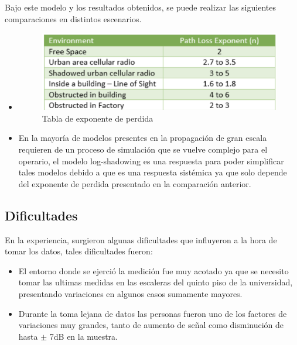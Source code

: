   
  Bajo este modelo y los resultados obtenidos, se puede realizar las siguientes comparaciones en distintos escenarios.
  
  \begin{itemize}
  \item 
  
   \begin{figure}[H]
        \centering
        \includegraphics[width=\linewidth]{Imagenes/Captura de pantalla 2022-11-10 a la(s) 19.42.05.png}
        \caption{Tabla de exponente de perdida \cite{tabla}}
        \label{transmisor}
  \end{figure}
  
 
 
 \item En la mayoría de modelos presentes en la propagación de gran escala requieren de un proceso de simulación que se vuelve complejo para el operario, el modelo log-shadowing es una respuesta para poder simplificar tales modelos debido a que es una respuesta sistémica ya que  solo depende del exponente de perdida presentado en la comparación anterior.
  \end{itemize}
  
  \subsection{Dificultades}
  
  En la experiencia, surgieron algunas dificultades que influyeron a la hora de tomar los datos, tales dificultades  fueron:
  
  \begin{itemize}
      \item El entorno donde se ejerció la medición fue muy acotado ya que se necesito tomar las ultimas medidas en las escaleras del quinto piso de la universidad, presentando variaciones en algunos casos sumamente mayores.
      \item Durante la toma lejana de datos las personas fueron uno de los factores de variaciones muy grandes, tanto de aumento de señal como disminución de hasta $\pm$ 7dB en la muestra.
  \end{itemize}
  
  
  